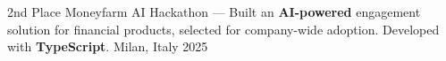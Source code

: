 


\begin{cvhonors}

  \cvhonor
    {2nd Place} %
    {Moneyfarm AI Hackathon — Built an \textbf{AI-powered} engagement solution for financial products, selected for company-wide adoption. Developed with \textbf{TypeScript}.} %
    {Milan, Italy} %
    {2025} %

\end{cvhonors}